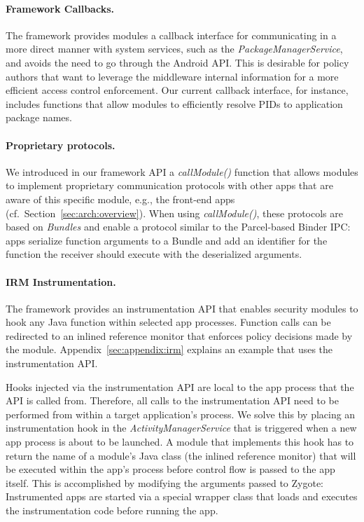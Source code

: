 \documentclass[letterpaper,twocolumn,10pt]{article}
\begin{document}
\paragraph{Framework Callbacks.}

The framework provides modules a callback interface for communicating in a more direct manner with system services, such as the \textit{PackageManagerService}, and avoids the need to go through the Android API. This is desirable for policy authors that want to leverage the middleware internal information for a more efficient access control enforcement. Our current callback interface, for instance, includes functions that allow modules to efficiently resolve PIDs to application package names.


\paragraph{Proprietary protocols.}

We introduced in our framework API a \textit{callModule()} function that allows modules to implement proprietary communication protocols with other apps that are aware of this specific module, e.g., the front-end apps (cf.~Section~\ref{sec:arch:overview}). When using \textit{callModule()}, these protocols are based on \emph{Bundles} and enable a protocol similar to the Parcel-based Binder IPC: apps serialize function arguments to a Bundle and add an identifier for the function the receiver should execute with the deserialized arguments.

\paragraph{IRM Instrumentation.}

The framework provides an instrumentation API that enables security modules to hook any Java function within selected app processes. Function calls can be redirected to an inlined reference monitor that enforces policy decisions made by the module. Appendix~\ref{sec:appendix:irm} explains an example that uses the instrumentation API.

Hooks injected via the instrumentation API are local to the app process that the API is called from. Therefore, all calls to the instrumentation API need to be performed from within a target application's process. We solve this by placing an instrumentation hook in the \textit{ActivityManagerService} that is triggered when a new app process is about to be launched. A module that implements this hook has to return the name of a module's Java class (the inlined reference monitor) that will be executed within the app's process before control flow is passed to the app itself. This is accomplished by modifying the arguments passed to Zygote: Instrumented apps are started via a special wrapper class that loads and executes the instrumentation code before running the app.
\end{document}
